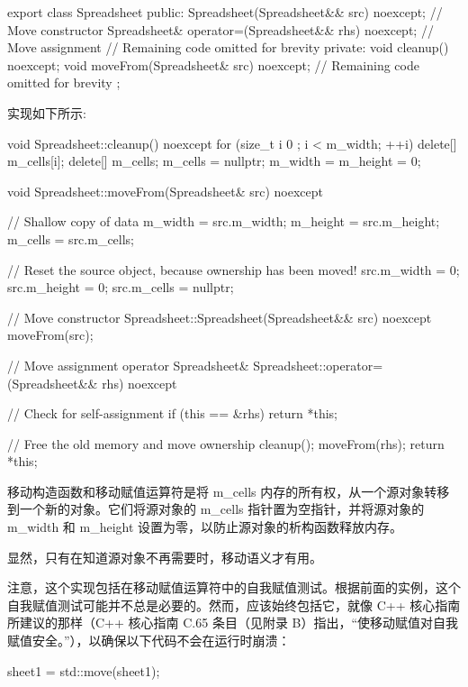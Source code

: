 \begin{cpp}
export class Spreadsheet
{
    public:
        Spreadsheet(Spreadsheet&& src) noexcept; // Move constructor
        Spreadsheet& operator=(Spreadsheet&& rhs) noexcept; // Move assignment
        // Remaining code omitted for brevity
    private:
        void cleanup() noexcept;
        void moveFrom(Spreadsheet& src) noexcept;
        // Remaining code omitted for brevity
};
\end{cpp}

实现如下所示:

\begin{cpp}
void Spreadsheet::cleanup() noexcept
{
    for (size_t i { 0 }; i < m_width; ++i) {
        delete[] m_cells[i];
    }
    delete[] m_cells;
    m_cells = nullptr;
    m_width = m_height = 0;
}

void Spreadsheet::moveFrom(Spreadsheet& src) noexcept
{
    // Shallow copy of data
    m_width = src.m_width;
    m_height = src.m_height;
    m_cells = src.m_cells;

    // Reset the source object, because ownership has been moved!
    src.m_width = 0;
    src.m_height = 0;
    src.m_cells = nullptr;
}

// Move constructor
Spreadsheet::Spreadsheet(Spreadsheet&& src) noexcept
{
    moveFrom(src);
}

// Move assignment operator
Spreadsheet& Spreadsheet::operator=(Spreadsheet&& rhs) noexcept
{
    // Check for self-assignment
    if (this == &rhs) {
        return *this;
    }

    // Free the old memory and move ownership
    cleanup();
    moveFrom(rhs);
    return *this;
}
\end{cpp}

移动构造函数和移动赋值运算符是将 m\_cells 内存的所有权，从一个源对象转移到一个新的对象。它们将源对象的 m\_cells 指针置为空指针，并将源对象的 m\_width 和 m\_height 设置为零，以防止源对象的析构函数释放内存。

显然，只有在知道源对象不再需要时，移动语义才有用。

注意，这个实现包括在移动赋值运算符中的自我赋值测试。根据前面的实例，这个自我赋值测试可能并不总是必要的。然而，应该始终包括它，就像 C++ 核心指南所建议的那样（C++ 核心指南 C.65 条目（见附录 B）指出，“使移动赋值对自我赋值安全。”），以确保以下代码不会在运行时崩溃：

\begin{cpp}
sheet1 = std::move(sheet1);
\end{cpp}

